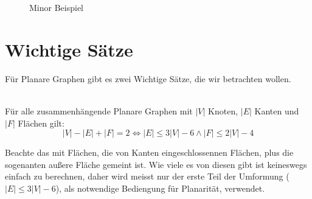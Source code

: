 \documentclass[runningheads]{llncs}
\begin{document}
\begin{figure}
    \begin{subfigure}{.50\textwidth}
        \centering
        \caption{}
    \end{subfigure}
    \begin{subfigure}{.48\textwidth}
        \centering
        \caption{}
    \end{subfigure}
    \caption{Minor Beispiel}
\end{figure}
\FloatBarrier
\section{Wichtige Sätze}
Für Planare Graphen gibt es zwei Wichtige Sätze, die wir betrachten wollen.
\begin{theorem}\\
    Für alle zusammenhängende Planare Graphen mit $|V|$ Knoten, $|E|$ Kanten und $|F|$ Flächen gilt:\\
    \[ |V|-|E|+|F|=2 \Leftrightarrow |E| \leq 3|V| - 6 \land |F| \leq 2|V| - 4 \]
\end{theorem}
Beachte das mit Flächen, die von Kanten eingeschlossennen Flächen, plus die sogenanten außere Fläche gemeint ist.
Wie viele es von diesen gibt ist keineswegs einfach zu berechnen, daher wird meisst nur der erste Teil der Umformung
($|E| \leq 3|V| - 6$), als notwendige Bediengung für Planarität, verwendet.
\end{document}
